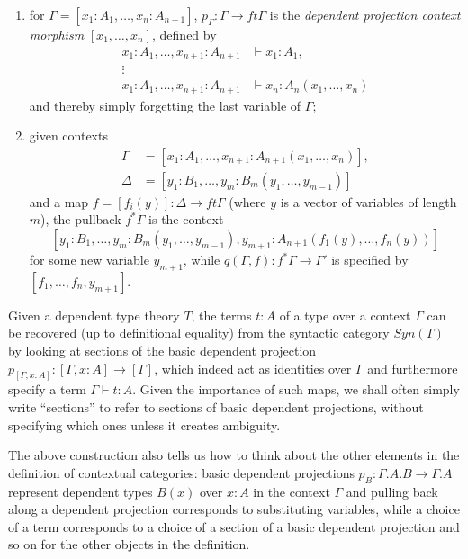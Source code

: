 \begin{construction}
\begin{enumerate}
    \item for $\Gamma=[x_1:A_1,\ldots,x_n:A_{n+1}]$,
      $p_{\Gamma}\colon\Gamma\rightarrow ft\Gamma$ is the \emph{dependent
      projection context morphism} $[x_1,\ldots,x_n]$, defined by
      \begin{align*}
        x_1:A_1,\ldots,x_{n+1}:A_{n+1} &\vdash x_1:A_1, \\
        \vdots & \\
        x_1:A_1,\ldots,x_{n+1}:A_{n+1} &\vdash x_n:A_n(x_1,\ldots,x_n)
      \end{align*}
      and thereby simply forgetting the last variable of $\Gamma$;
    \item given contexts
      \begin{align*}
        \Gamma &=[x_1:A_1,\ldots,x_{n+1}:A_{n+1}(x_1,\ldots,x_n)], \\
        \Delta &=[y_1:B_1,\ldots,y_m:B_m(y_1,\ldots,y_{m-1})]
      \end{align*}
      and a map $f=[f_i(y)]\colon\Delta\rightarrow ft\Gamma$ (where $y$ is a
      vector of variables of length $m$), the pullback $f^*\Gamma$ is the
      context
      \[[y_1:B_1,\ldots,y_m:B_m(y_1,\ldots,y_{m-1}),y_{m+1}:A_{n+1}(f_1(y),\ldots,f_n(y))]\]
      for some new variable $y_{m+1}$, while $q(\Gamma,f)\colon
      f^*\Gamma\rightarrow\Gamma'$ is specified by $[f_1,\ldots,f_n,y_{m+1}]$.
  \end{enumerate}
\end{construction}

\begin{rmk}
  Given a dependent type theory $T$, the terms $t:A$ of a type over a context
  $\Gamma$ can be recovered (up to definitional equality) from the syntactic
  category $Syn(T)$ by looking at sections of the basic dependent projection
  $p_{[\Gamma,x:A]}\colon[\Gamma,x:A]\rightarrow[\Gamma]$, which indeed act as
  identities over $\Gamma$ and furthermore specify a term $\Gamma\vdash t:A$.
  Given the importance of such maps, we shall often simply write ``sections'' to
  refer to sections of basic dependent projections, without specifying which ones
  unless it creates ambiguity.

  The above construction also tells us how to think about the other elements in
  the definition of contextual categories: basic dependent
  projections $p_B\colon\Gamma.A.B\rightarrow\Gamma.A$ represent dependent
  types $B(x)$ over $x:A$ in the context $\Gamma$ and pulling back along
  a dependent projection corresponds to substituting variables, while a choice of
  a term corresponds to a choice of a section of a basic dependent projection
  and so on for the other objects in the definition.
\end{rmk}

